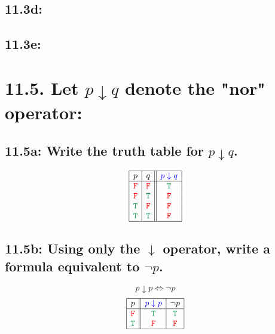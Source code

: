 \documentclass{article}
\newcommand\true{\textcolor{ForestGreen}{\texttt{T}}}
\newcommand\false{\textcolor{red}{\texttt{F}}}
\begin{document}
\subsection*{11.3d:}
\subsection*{11.3e:}
\section*{11.5. Let $p\downarrow q$ denote the "nor" operator:}
\subsection*{11.5a: Write the truth table for $p\downarrow q$.}
\[\begin{array}{|c|c||c|}
\hline
p&q&\textcolor{blue}{p\downarrow q}\\
\hline
\false&\false&\true\\
\false&\true&\false\\
\true&\false&\false\\
\true&\true&\false\\
\hline
\end{array}\]
\subsection*{11.5b: Using only the $\downarrow$ operator, write a formula equivalent to $\neg p$.}
\[p\downarrow p\Leftrightarrow\neg p\]
\[\begin{array}{|c||c|c|}
\hline
p&\textcolor{blue}{p\downarrow p}&\neg p\\
\hline
\false&\true&\true\\
\true&\false&\false\\
\hline
\end{array}\]
\end{document}
